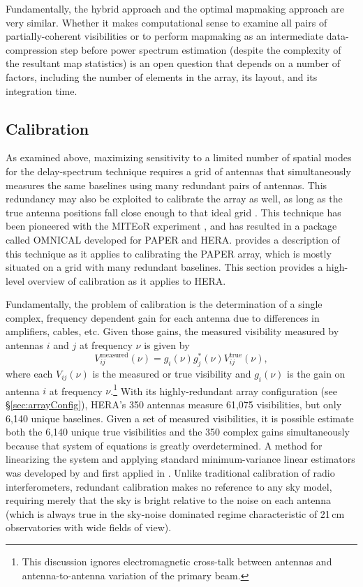 \documentclass[preprint,11pt]{aastex}
\begin{document}
Fundamentally, the hybrid approach and the optimal mapmaking approach \citep{dillon_et_al2015a} are very similar. Whether it makes computational sense to examine all pairs of partially-coherent visibilities or to perform mapmaking as an intermediate data-compression step before power spectrum estimation (despite the complexity of the resultant map statistics) is an open question that depends on a number of factors, including the number of elements in the array, its layout, and its integration time.



\subsection{Calibration}
\label{sec:calibration}
As examined above, maximizing sensitivity to a limited number of spatial modes for the delay-spectrum technique requires a grid of antennas that simultaneously measures the same baselines using many redundant pairs of antennas. This redundancy may also be exploited to calibrate the array as well, as long as the true antenna positions fall close enough to that ideal grid \citep{liu_et_al2010}. This technique has been pioneered with the MITEoR experiment \citep{zheng_et_al2014}, and has resulted in a package called OMNICAL developed for PAPER and HERA.  \citet{ali_et_al2015} provides a description of this technique as it applies to calibrating the PAPER array, which is mostly situated on a grid with many redundant baselines.  This section provides a high-level overview of calibration as it applies to HERA.

Fundamentally, the problem of calibration is the determination of a single complex, frequency dependent gain for each antenna due to differences in amplifiers, cables, etc. Given those gains, the measured visibility measured by antennas $i$ and $j$ at frequency $\nu$ is given by 
\begin{equation}
V_{ij}^\text{measured}(\nu) = g_i(\nu) g_j^*(\nu) V_{ij}^\text{true}(\nu), 
\end{equation}
where each $V_{ij}(\nu)$ is the measured or true visibility and $g_i(\nu)$ is the gain on antenna $i$ at frequency $\nu$.\footnote{This discussion ignores electromagnetic cross-talk between antennas and antenna-to-antenna variation of the primary beam.} With its highly-redundant array configuration (see \S\ref{sec:arrayConfig}), HERA's 350 antennas measure 61,075 visibilities, but only 6,140 unique baselines. Given a set of measured visibilities, it is possible estimate both the 6,140 unique true visibilities and the 350 complex gains simultaneously because that system of equations is greatly overdetermined. A method for linearizing the system and applying standard minimum-variance linear estimators was developed by \citet{liu_et_al2010} and first applied in \citet{zheng_et_al2014}. Unlike traditional calibration of radio interferometers, redundant calibration makes no reference to any sky model, requiring merely that the sky is bright relative to the noise on each antenna (which is always true in the sky-noise dominated regime characteristic of 21\,cm observatories with wide fields of view). 
\end{document}
